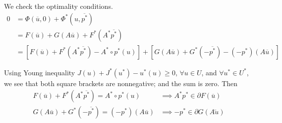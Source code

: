 We check the optimality conditions.
\begin{align*}
	0&=\Phi (\overline{u},0)+\Phi^*(u, \overline{p^*}) \\
	&= F(\overline{u})+G(A\overline{u})+F^*(A^*\overline{p^*})\\
	&= [F(\overline{u})+F^*(A^*\overline{p^*})-A^*\circ p^*(u)]+[G(A\overline{u})+G^*(-\overline{p^*})-(-p^*)(A\overline{u})]
\end{align*}

Using Young inequality $J(u)+J^*(u^*)-u^*(u)\geq 0$, $\forall u \in U$, and $\forall u^* \in U^*$, we see that both square brackets are nonnegative; and the sum is zero. Then
\begin{align*}
	F(\overline{u})+F^*(A^*\overline{p^*})=A^*\circ p^*(u) &\implies A^*p^* \in \partial F(\overline{u}) \\
	G(A\overline{u})+G^*(-\overline{p^*})=(-p^*)(A\overline{u}) &\implies -p^* \in \partial G(A\overleftarrow{u})
\end{align*}

